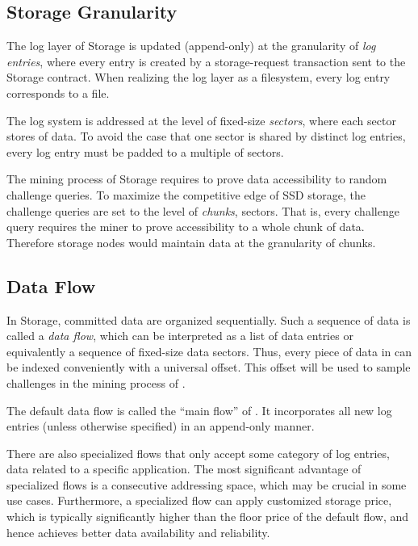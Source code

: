 \subsection{Storage Granularity}

The log layer of \projabbrev Storage is updated (append-only) at the granularity of \emph{log entries}, 
where every entry is created by a storage-request transaction sent to the \projabbrev Storage contract.
When realizing the log layer as a filesystem, every log entry corresponds to a file.

The log system is addressed at the level of fixed-size \emph{sectors}, where each sector stores \sectorsize of data. 
To avoid the case that one sector is shared by distinct log entries,
every log entry must be padded to a multiple of sectors.

The mining process of \projabbrev Storage requires to prove data accessibility to random challenge queries.
To maximize the competitive edge of SSD storage, the challenge queries are set to the level of \chunksize \emph{chunks},  sectors.
That is, every challenge query requires the miner to prove accessibility to a whole chunk of data. 
Therefore storage nodes would maintain data at the granularity of chunks. 

\subsection{Data Flow}
In \projabbrev Storage, committed data are organized sequentially.
Such a sequence of data is called a \emph{data flow}, which can be interpreted as a list of data entries or equivalently a sequence of fixed-size data sectors.
Thus, every piece of data in \project can be indexed conveniently with a universal offset.
This offset will be used to sample challenges in the mining process of \sproof.


The default data flow is called the ``main flow'' of \project.
It incorporates all new log entries (unless otherwise specified) in an append-only manner.

There are also specialized flows that only accept some category of log entries,
\eg data related to a specific application.
The most significant advantage of specialized flows is a consecutive addressing space, which may be crucial in some use cases. 
Furthermore, a specialized flow can apply customized storage price, which is typically significantly higher than the floor price of the default flow, and hence achieves better  data availability and reliability.